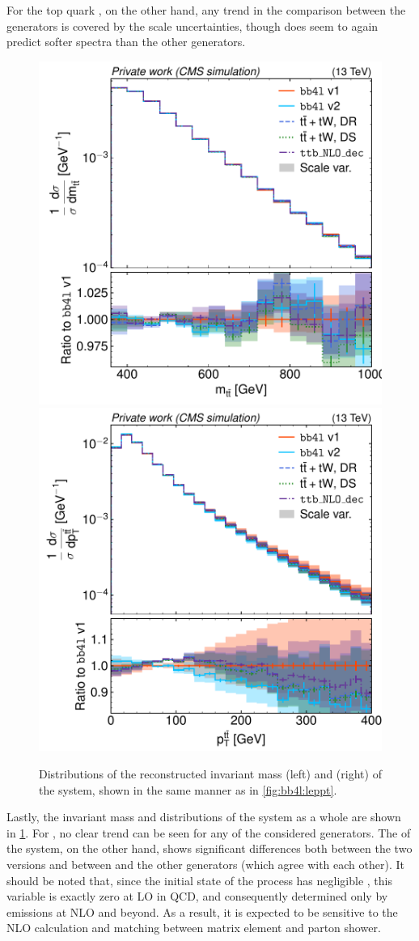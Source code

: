 For the top quark \pt, on the other hand, any trend in the comparison between the generators is covered by the scale uncertainties, though \bbfourl does seem to again predict softer \pt spectra than the other generators.

\begin{figure}[tp]
    \centering
    \includegraphics[width=0.49 \textwidth]{figures/bb4l/generators/MC_TTBAR_DILEP_SPINDENSITY_ttbar_mass.pdf}
    \hfill
    \includegraphics[width=0.49 \textwidth]{figures/bb4l/generators/MC_TTBAR_DILEP_SPINDENSITY_ttbar_pt.pdf}
    \caption{Distributions of the reconstructed invariant mass (left) and \pt (right) of the \ttbar system, shown in the same manner as in \cref{fig:bb4l:leppt}.}
    \label{fig:bb4l:ttbar}
\end{figure}

Lastly, the invariant mass and \pt distributions of the \ttbar system as a whole are shown in \cref{fig:bb4l:ttbar}. For \mtt, no clear trend can be seen for any of the considered generators. The \pt of the \ttbar system, on the other hand, shows significant differences both between the two \bbfourl versions and between \bbfourl and the other generators (which agree with each other). It should be noted that, since the initial state of the \pptt process has negligible \pt, this variable is exactly zero at LO in QCD, and consequently determined only by emissions at NLO and beyond. As a result, it is expected to be sensitive to the NLO calculation and matching between matrix element and parton shower.

